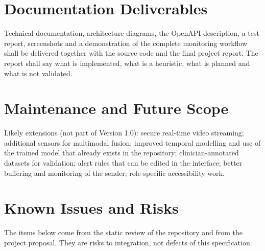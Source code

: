 \documentclass[a4paper,11pt]{scrreprt}
\begin{document}
\section{Documentation Deliverables}
Technical documentation, architecture diagrams, the OpenAPI description, a test report, screenshots and a demonstration of the complete monitoring workflow shall be delivered together with the source code and the final project report. The report shall say what is implemented, what is a heuristic, what is planned and what is not validated.

\section{Maintenance and Future Scope}
Likely extensions (not part of Version 1.0): secure real-time video streaming; additional sensors for multimodal fusion; improved temporal modelling and use of the trained model that already exists in the repository; clinician-annotated datasets for validation; alert rules that can be edited in the interface; better buffering and monitoring of the sender; role-specific accessibility work.

\section{Known Issues and Risks}\label{sec:risks}
The items below come from the static review of the repository and from the project proposal. They are risks to integration, not defects of this specification.
\end{document}
